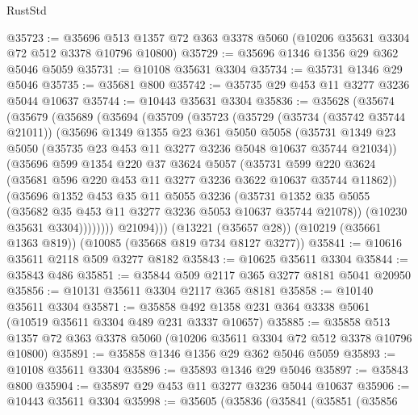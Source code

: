 \begin{lexlean}{RustStd}
\begin{coremodule}
@35723 := @35696 @513 @1357 @72 @363 @3378 @5060 (@10206 @35631 @3304 @72 @512 @3378 @10796 @10800)
@35729 := @35696 @1346 @1356 @29 @362 @5046 @5059
@35731 := @10108 @35631 @3304
@35734 := @35731 @1346 @29 @5046
@35735 := @35681 @800
@35742 := @35735 @29 @453 @11 @3277 @3236 @5044 @10637
@35744 := @10443 @35631 @3304
@35836 := @35628
    (@35674
      (@35679
        (@35689
          (@35694
            (@35709
              (@35723
                (@35729
                  (@35734 (@35742 @35744 @21011))
                  (@35696
                    @1349
                    @1355
                    @23
                    @361
                    @5050
                    @5058
                    (@35731
                      @1349
                      @23
                      @5050
                      (@35735 @23 @453 @11 @3277 @3236 @5048 @10637 @35744 @21034))
                    (@35696
                      @599
                      @1354
                      @220
                      @37
                      @3624
                      @5057
                      (@35731
                        @599
                        @220
                        @3624
                        (@35681 @596 @220 @453 @11 @3277 @3236 @3622 @10637 @35744 @11862))
                      (@35696
                        @1352
                        @453
                        @35
                        @11
                        @5055
                        @3236
                        (@35731
                          @1352
                          @35
                          @5055
                          (@35682 @35 @453 @11 @3277 @3236 @5053 @10637 @35744 @21078))
                        (@10230 @35631 @3304))))))))
          @21094)))
    (@13221 (@35657 @28))
    (@10219 (@35661 @1363 @819))
    (@10085 (@35668 @819 @734 @8127 @3277))
@35841 := @10616 @35611 @2118 @509 @3277 @8182
@35843 := @10625 @35611 @3304
@35844 := @35843 @486
@35851 := @35844 @509 @2117 @365 @3277 @8181 @5041 @20950
@35856 := @10131 @35611 @3304 @2117 @365 @8181
@35858 := @10140 @35611 @3304
@35871 := @35858 @492 @1358 @231 @364 @3338 @5061 (@10519 @35611 @3304 @489 @231 @3337 @10657)
@35885 := @35858 @513 @1357 @72 @363 @3378 @5060 (@10206 @35611 @3304 @72 @512 @3378 @10796 @10800)
@35891 := @35858 @1346 @1356 @29 @362 @5046 @5059
@35893 := @10108 @35611 @3304
@35896 := @35893 @1346 @29 @5046
@35897 := @35843 @800
@35904 := @35897 @29 @453 @11 @3277 @3236 @5044 @10637
@35906 := @10443 @35611 @3304
@35998 := @35605
    (@35836
      (@35841
        (@35851
          (@35856

\end{coremodule}
\end{lexlean}
